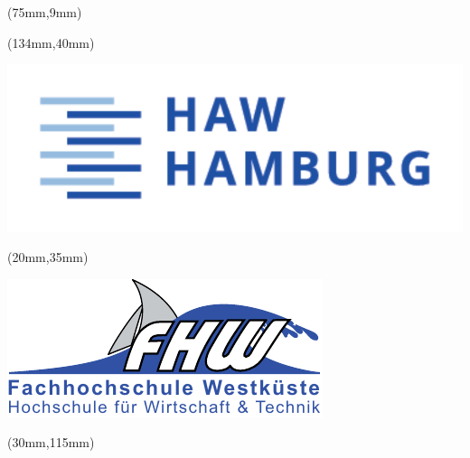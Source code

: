 %
%

\thispagestyle{empty}
\begin{titlepage}
{\selectfont

  \hfuzz=20pt
\begin{textblock*}{\textwidth}(75mm,9mm)
  \begin{minipage}[b][0cm][b]{\textwidth}
  \hfuzz=20pt
  \fontsize{16pt}{16pt}
  \selectfont
    \begin{flushleft}
    	  \IthesisNDAFull
    \end{flushleft}
  \end{minipage}
\end{textblock*}

\begin{textblock*}{\textwidth}(134mm,40mm)
  \begin{minipage}[b][0cm][b]{\textwidth}
    \includegraphics[scale=0.5]{../style/HAW_Marke_CMYK}
  \end{minipage}
\end{textblock*}

\begin{textblock*}{\textwidth}(20mm,35mm)
  \begin{minipage}[b][0cm][b]{\textwidth}
    \includegraphics[scale=0.9]{../style/fhwlogo}
  \end{minipage}
\end{textblock*}


\begin{textblock*}{\textwidth}(30mm,115mm)
  \begin{minipage}[b][0cm][b]{\textwidth}
    \fontsize{22pt}{20pt}
    \selectfont
  	\begin{flushright}
      \IthesisKind
  	\end{flushright}
  \end{minipage}
\end{textblock*}

}
\end{titlepage}
